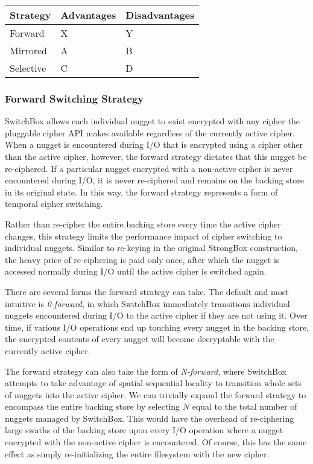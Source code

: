 \begin{table}[]
   \begin{tabular}{@{}lll@{}}
   \toprule
   \textbf{Strategy} & \textbf{Advantages} & \textbf{Disadvantages} \\ \midrule
   Forward       & X     & Y \\
   Mirrored      & A     & B \\
   Selective     & C     & D \\
   \end{tabular}
   \caption{}
   \label{tbl:strategies-advantages}
\end{table}

\subsubsection{Forward Switching Strategy}

SwitchBox allows each individual nugget to exist encrypted with any cipher the
pluggable cipher API makes available regardless of the currently active cipher.
When a nugget is encountered during I/O that is encrypted using a cipher other
than the active cipher, however, the forward strategy dictates that this nugget
be re-ciphered. If a particular nugget encrypted with a non-active cipher is
never encountered during I/O, it is never re-ciphered and remains on the backing
store in its original state. In this way, the forward strategy represents a form
of temporal cipher switching.

Rather than re-cipher the entire backing store every time the active cipher
changes, this strategy limits the performance impact of cipher switching to
individual nuggets. Similar to re-keying in the original StrongBox construction,
the heavy price of re-ciphering is paid only once, after which the nugget is
accessed normally during I/O until the active cipher is switched again.

There are several forms the forward strategy can take. The default and most
intuitive is \emph{0-forward}, in which SwitchBox immediately transitions
individual nuggets encountered during I/O to the active cipher if they are not
using it. Over time, if various I/O operations end up touching every nugget in
the backing store, the encrypted contents of every nugget will become
decryptable with the currently active cipher.

The forward strategy can also take the form of \emph{N-forward}, where SwitchBox
attempts to take advantage of spatial sequential locality to transition whole
sets of nuggets into the active cipher. We can trivially expand the forward
strategy to encompass the entire backing store by selecting $N$ equal to the
total number of nuggets managed by SwitchBox. This would have the overhead of
re-ciphering large swaths of the backing store upon every I/O operation where a
nugget encrypted with the non-active cipher is encountered. Of course, this has
the same effect as simply re-initializing the entire filesystem with the new
cipher.

